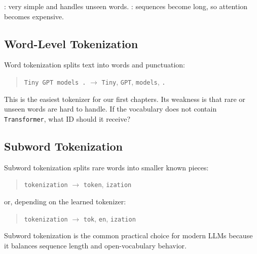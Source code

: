 \begin{center}
\end{center}

: very simple and handles unseen words.  
: sequences become long, so attention becomes expensive.

\subsection{Word-Level Tokenization}

Word tokenization splits text into words and punctuation:

\begin{quote}
\texttt{Tiny GPT models .} \(\rightarrow\)
\texttt{Tiny}, \texttt{GPT}, \texttt{models}, \texttt{.}
\end{quote}

This is the easiest tokenizer for our first chapters. Its weakness is that rare or unseen words are hard to handle. If the vocabulary does not contain \texttt{Transformer}, what ID should it receive?

\subsection{Subword Tokenization}

Subword tokenization splits rare words into smaller known pieces:

\begin{quote}
\texttt{tokenization} \(\rightarrow\) \texttt{token}, \texttt{ization}
\end{quote}

or, depending on the learned tokenizer:

\begin{quote}
\texttt{tokenization} \(\rightarrow\) \texttt{tok}, \texttt{en}, \texttt{ization}
\end{quote}

Subword tokenization is the common practical choice for modern LLMs because it balances sequence length and open-vocabulary behavior.

